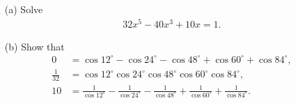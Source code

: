 \begin{tcolorbox}
\begin{question}
\begin{itemize}
    \item[(a)] Solve
\begin{align*}
    32x^5 - 40x^3 + 10x = 1.
\end{align*}
    \item[(b)] Show that
    \begin{align*}
        0 &= \cos 12^\circ - \cos 24^\circ - \cos 48^\circ + \cos 60^\circ + \cos 84^\circ,\\
        \frac{1}{32} &= \cos 12^\circ \cos 24^\circ \cos 48^\circ \cos 60^\circ \cos 84^\circ,\\
        10 &= \frac{1}{\cos 12^\circ} -\frac{1}{\cos 24^\circ}-\frac{1}{\cos 48^\circ} + \frac{1}{\cos 60^\circ} +\frac{1}{\cos 84^\circ}.
    \end{align*}
\end{itemize}
\end{question}
\end{tcolorbox}

